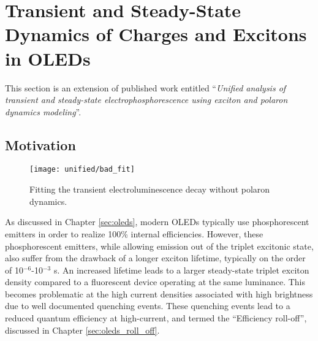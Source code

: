 \documentclass[../thesis.tex]{subfiles}
\begin{document}
\chapter{Transient and Steady-State Dynamics of Charges and Excitons in OLEDs}\label{sec:unified}

This section is an extension of published work entitled ``\textit{Unified analysis of transient and steady-state electrophosphorescence using exciton and polaron dynamics modeling}''.\supercite{Hershey2016}

\section{Motivation}

\begin{wrapfigure}{R}{0.5\textwidth}
\centering
\texttt{[image: unified/bad\_fit]}
\caption{Fitting the transient electroluminescence decay without polaron dynamics.}
\label{fig:bad_fit}
\end{wrapfigure}

As discussed in Chapter \ref{sec:oleds}, modern OLEDs typically use phosphorescent emitters in order to realize 100\% internal efficiencies.\supercite{Baldo2000,Baldo1998a,Tsutsui1999,OBrien1999a}
However, these phosphorescent emitters, while allowing emission out of the triplet excitonic state, also suffer from the drawback of a longer exciton lifetime, typically on the order of 10$^{-6}$-10$^{-3}$ s.\supercite{Baldo1998a,Holmes2003}
An increased lifetime leads to a larger steady-state triplet exciton density compared to a fluorescent device operating at the same luminance.  
This becomes problematic at the high current densities associated with high brightness due to well documented quenching events.\supercite{Reineke2007,Reineke2007a,Reineke2009,Mezyk2005,Kalinowski2002,Song2010,Erickson2014}
These quenching events lead to a reduced quantum efficiency at high-current, and termed the ``Efficiency roll-off'', discussed in Chapter \ref{sec:oleds_roll_off}.  
\end{document}
